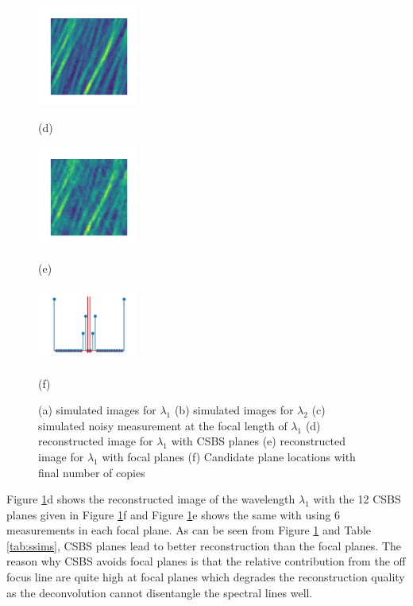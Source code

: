 \documentclass{article}
\begin{document}
\begin{figure}[t]
\vspace{-0.15 in}
\begin{minipage}[b]{0.31\linewidth}
  \centering
  \centerline{\includegraphics[width=3.3cm]{recon_csbs}}
  \vspace{-0.15 in}
  \centerline{(d)}
\end{minipage}
\begin{minipage}[b]{0.31\linewidth}
  \centering
  \centerline{\includegraphics[width=3.3cm]{recon_focus}}
  \vspace{-0.15 in}
  \centerline{(e)}
\end{minipage}
\begin{minipage}[b]{0.31\linewidth}
  \centering
  \centerline{\includegraphics[width=3.3cm]{planes}}
  \vspace{-0.15 in}
  \centerline{(f)}
\end{minipage}
\caption{(a) simulated images for $\lambda_1$ (b) simulated images for $\lambda_2$
(c) simulated noisy measurement at the focal length of $\lambda_1$ (d) reconstructed image for $\lambda_1$ with CSBS planes (e) reconstructed image for $\lambda_1$ with focal planes (f) Candidate plane locations with final number of copies}
\label{fig:results}
\end{figure}

Figure \ref{fig:results}d shows the reconstructed image of the wavelength
$\lambda_1$ with the 12 CSBS planes given in Figure \ref{fig:results}f and
Figure \ref{fig:results}e shows the same with using 6 measurements in each focal
plane. As can be seen from Figure \ref{fig:results} and Table \ref{tab:ssims},
CSBS planes lead to better reconstruction than the focal planes. The reason why
CSBS avoids focal planes is that the relative contribution from the off focus
line are quite high at focal planes which degrades the reconstruction quality
as the deconvolution cannot disentangle the spectral lines well.
\end{document}
